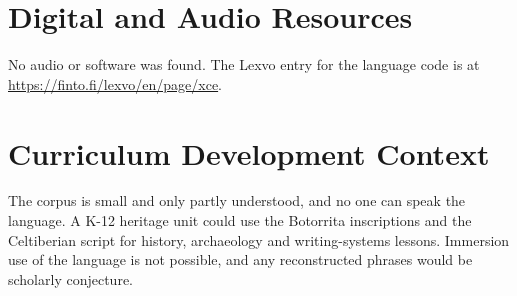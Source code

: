 \documentclass[12pt]{article}
\begin{document}
\section{Digital and Audio Resources}
No audio or software was found. The Lexvo entry for the language code is at \url{https://finto.fi/lexvo/en/page/xce}.

\section{Curriculum Development Context}
The corpus is small and only partly understood, and no one can speak the language. A K-12 heritage unit could use the Botorrita inscriptions and the Celtiberian script for history, archaeology and writing-systems lessons. Immersion use of the language is not possible, and any reconstructed phrases would be scholarly conjecture.
\end{document}
